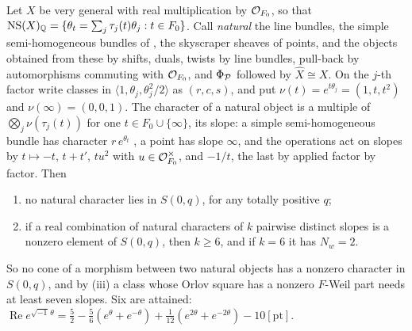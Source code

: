 \begin{remark}\label{rem:sexticnatural}
Let $X$ be very general with real multiplication by $\mathcal{O}_{F_{0}}$, so that
$\mathrm{NS}(X)_{\mathbb{Q}}=\{\theta_{t}=\sum_{j}\tau_{j}(t)\theta_{j}:t\in F_{0}\}$. Call
\emph{natural} the line bundles, the simple semi-homogeneous bundles of
\cite{Muk78}, the skyscraper sheaves of points, and the objects obtained from
these by shifts, duals, twists by line bundles, pull-back by automorphisms
commuting with $\mathcal{O}_{F_{0}}$, and $\Phi_{\mathcal{P}}$ followed by $\widehat X\cong X$.
On the $j$-th factor write classes in $\langle1,\theta_{j},\theta_{j}^{2}/2
\rangle$ as $(r,c,s)$, and put $\nu(t)=e^{t\theta_{j}}=(1,t,t^{2})$ and
$\nu(\infty)=(0,0,1)$. The character of a natural object is a multiple of
$\bigotimes_{j}\nu(\tau_{j}(t))$ for one $t\in F_{0}\cup\{\infty\}$, its
slope: a simple semi-homogeneous bundle has character $r\,e^{\theta_{t}}$
\cite{Muk78}, a point has slope $\infty$, and the operations act on slopes by
$t\mapsto-t$, $t+t'$, $tu^{2}$ with $u\in\mathcal{O}_{F_{0}}^{\times}$, and $-1/t$,
the last by \cite[Theorem~6.5]{paperI} applied factor by factor. Then
\begin{enumerate}[label=\textup{(\alph*)},leftmargin=2.6em,itemsep=2pt]
\item no natural character lies in $S(0,q)$, for any totally positive $q$;
\item if a real combination of natural characters of $k$ pairwise distinct
  slopes is a nonzero element of $S(0,q)$, then $k\ge6$, and if $k=6$ it has
  $N_{w}=2$.
\end{enumerate}
So no cone of a morphism between two natural objects has a nonzero character
in $S(0,q)$, and by (iii) a class whose Orlov square has
a nonzero $F$-Weil part needs at least seven slopes. Six are attained:
$\operatorname{Re}e^{\sqrt{-1}\,\theta}=\frac52-\frac56(e^{\theta}+e^{-\theta})
+\frac1{12}(e^{2\theta}+e^{-2\theta})-10[\mathrm{pt}]$.


\end{remark}
